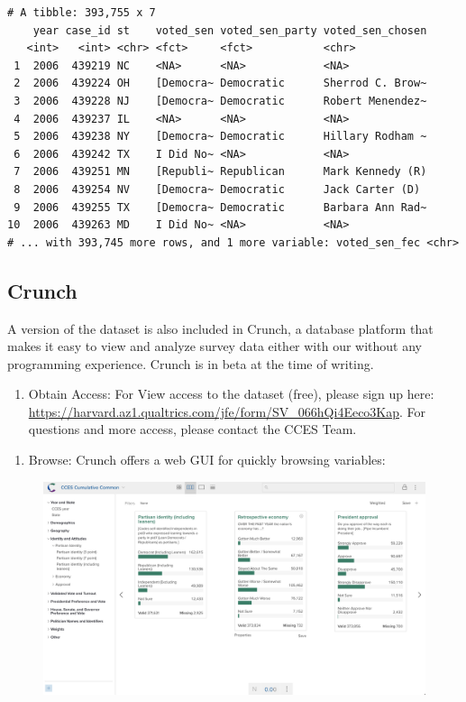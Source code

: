 \documentclass[10pt,article,oneside]{memoir}
\theoremstyle{definition}
\begin{document}
\begin{verbatim}
# A tibble: 393,755 x 7
    year case_id st    voted_sen voted_sen_party voted_sen_chosen
   <int>   <int> <chr> <fct>     <fct>           <chr>           
 1  2006  439219 NC    <NA>      <NA>            <NA>            
 2  2006  439224 OH    [Democra~ Democratic      Sherrod C. Brow~
 3  2006  439228 NJ    [Democra~ Democratic      Robert Menendez~
 4  2006  439237 IL    <NA>      <NA>            <NA>            
 5  2006  439238 NY    [Democra~ Democratic      Hillary Rodham ~
 6  2006  439242 TX    I Did No~ <NA>            <NA>            
 7  2006  439251 MN    [Republi~ Republican      Mark Kennedy (R)
 8  2006  439254 NV    [Democra~ Democratic      Jack Carter (D) 
 9  2006  439255 TX    [Democra~ Democratic      Barbara Ann Rad~
10  2006  439263 MD    I Did No~ <NA>            <NA>            
# ... with 393,745 more rows, and 1 more variable: voted_sen_fec <chr>
\end{verbatim}

\hypertarget{crunch}{%
\subsection{Crunch}\label{crunch}}

A version of the dataset is also included in Crunch, a database platform
that makes it easy to view and analyze survey data either with our
without any programming experience. Crunch is in beta at the time of
writing.

\begin{enumerate}
\def\labelenumi{\arabic{enumi}.}
\tightlist
\item
  Obtain Access: For View access to the dataset (free), please sign up
  here:
  \url{https://harvard.az1.qualtrics.com/jfe/form/SV_066hQi4Eeco3Kap}.
  For questions and more access, please contact the CCES Team.
\end{enumerate}

\newpage

\begin{enumerate}
\def\labelenumi{\arabic{enumi}.}
\setcounter{enumi}{1}
\tightlist
\item
  Browse: Crunch offers a web GUI for quickly browsing variables:
\end{enumerate}

\begin{figure}[H]
\centering
\centerline{\includegraphics[width=1.05\linewidth]{01_crunch_browse.png}}
\end{figure}
\end{document}
